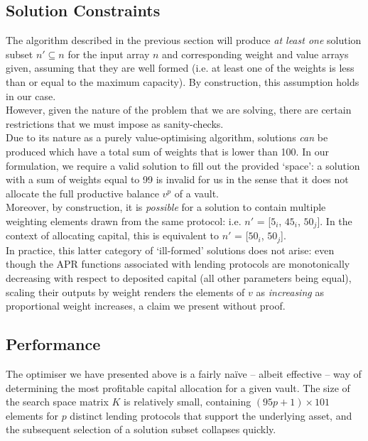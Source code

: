 \documentclass{article}
\begin{document}
\newpage
\subsection{Solution Constraints}
\label{soln-constraints}

\noindent
The algorithm described in the previous section will produce \textit{at least one} solution subset $n' \subseteq n$ for the input array $n$ and corresponding weight and value arrays given, assuming that they are well formed (i.e. at least one of the weights is less than or equal to the maximum capacity). By construction, this assumption holds in our case.\\

\noindent
However, given the nature of the problem that we are solving, there are certain restrictions that we must impose as sanity-checks.\\

\noindent
Due to its nature as a purely value-optimising algorithm, solutions \textit{can} be produced which have a total sum of weights that is lower than 100. In our formulation, we require a valid solution to fill out the provided `space': a solution with a sum of weights equal to 99 is invalid for us in the sense that it does not allocate the full productive balance $v^p$ of a vault.\\

\noindent
Moreover, by construction, it is \textit{possible} for a solution to contain multiple weighting elements drawn from the same protocol: i.e. $n'$ = [$5_i$, $45_i$, $50_j$]. In the context of allocating capital, this is equivalent to $n'$ = [$50_i$, $50_j$].\\

\noindent
In practice, this latter category of `ill-formed' solutions does not arise: even though the APR functions associated with lending protocols are monotonically decreasing with respect to deposited capital (all other parameters being equal), scaling their outputs by weight renders the elements of $v$ as \textit{increasing} as proportional weight increases, a claim we present without proof.

\subsection{Performance}

The optimiser we have presented above is a fairly na\"{i}ve -- albeit effective -- way of determining the most profitable capital allocation for a given vault. The size of the search space matrix $K$ is relatively small, containing $(95p + 1) \times 101$ elements for $p$ distinct lending protocols that support the underlying asset, and the subsequent selection of a solution subset collapses quickly.\\
\end{document}
